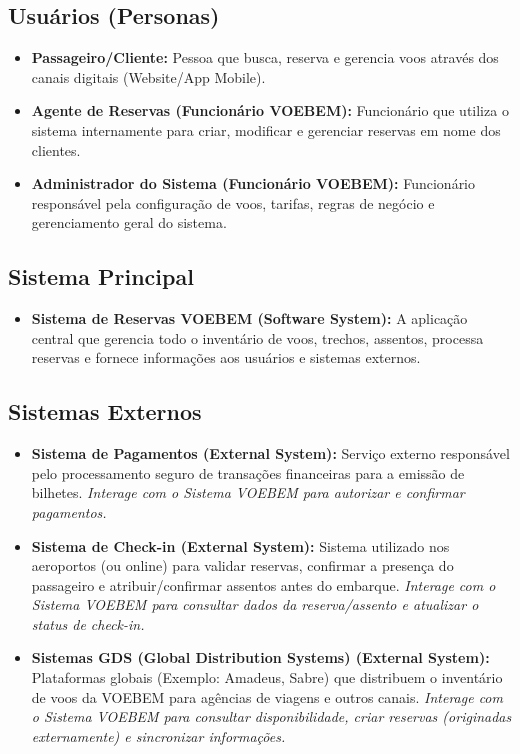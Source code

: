 \subsection{Usuários (Personas)}
\label{subsec:c4-contexto-usuarios}
\begin{itemize}
    \item \textbf{Passageiro/Cliente:} Pessoa que busca, reserva e gerencia voos através dos canais digitais (Website/App Mobile).
    \item \textbf{Agente de Reservas (Funcionário VOEBEM):} Funcionário que utiliza o sistema internamente para criar, modificar e gerenciar reservas em nome dos clientes.
    \item \textbf{Administrador do Sistema (Funcionário VOEBEM):} Funcionário responsável pela configuração de voos, tarifas, regras de negócio e gerenciamento geral do sistema.
\end{itemize}

\subsection{Sistema Principal}
\label{subsec:c4-contexto-sistema-principal}
\begin{itemize}
    \item \textbf{Sistema de Reservas VOEBEM (Software System):} A aplicação central que gerencia todo o inventário de voos, trechos, assentos, processa reservas e fornece informações aos usuários e sistemas externos.
\end{itemize}

\subsection{Sistemas Externos}
\label{subsec:c4-contexto-sistemas-externos}
\begin{itemize}
    \item \textbf{Sistema de Pagamentos (External System):} Serviço externo responsável pelo processamento seguro de transações financeiras para a emissão de bilhetes. \textit{Interage com o Sistema VOEBEM para autorizar e confirmar pagamentos.}
    \item \textbf{Sistema de Check-in (External System):} Sistema utilizado nos aeroportos (ou online) para validar reservas, confirmar a presença do passageiro e atribuir/confirmar assentos antes do embarque. \textit{Interage com o Sistema VOEBEM para consultar dados da reserva/assento e atualizar o status de check-in.}
    \item \textbf{Sistemas GDS (Global Distribution Systems) (External System):} Plataformas globais (Exemplo: Amadeus, Sabre) que distribuem o inventário de voos da VOEBEM para agências de viagens e outros canais. \textit{Interage com o Sistema VOEBEM para consultar disponibilidade, criar reservas (originadas externamente) e sincronizar informações.}
\end{itemize}

